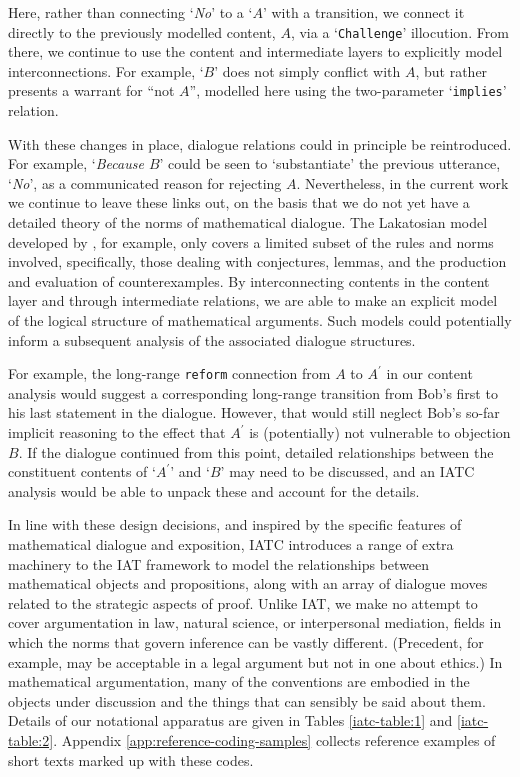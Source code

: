 \documentclass[smallextended,oneside]{svjour3}       %
\newcommand\nothing[1]{#1}
\let\paragraph\nothing
\begin{document}
Here, rather than connecting `\emph{No}' to a `$A$' with a transition, we connect
it directly to the previously modelled content, $A$, via a
`\texttt{Challenge}' illocution.  From there, we continue
to use the content and intermediate layers to explicitly model
interconnections.  For example,
`$B$' does not simply conflict with $A$, but rather presents a
warrant for ``not $A$'', modelled here using the two-parameter
`\texttt{implies}' relation.

With these changes in place, dialogue relations could in principle
be reintroduced.
For example, `\emph{Because $B$}' could be seen
to `substantiate' the previous utterance, `\emph{No}', as a communicated
reason for rejecting $A$.
Nevertheless, in the current work we continue to leave these links out, on the
basis that we do not yet have a detailed theory of the norms of mathematical dialogue.
The Lakatosian model developed by \citet{lak}, for example, only covers
a limited subset of the rules
and norms involved, specifically, those dealing with conjectures,
lemmas, and the production and evaluation of counterexamples.
By interconnecting contents in the content layer
and through intermediate relations,
we are able to make an explicit model of the logical structure of mathematical arguments.  Such models could potentially inform a subsequent analysis of the associated dialogue structures.

For example, the long-range \texttt{reform} connection from $A$ to $A^\prime$ in
our content analysis would suggest a corresponding long-range transition from
Bob's first to his last statement in the dialogue.
However, that would still neglect Bob's so-far implicit reasoning
to the effect that $A^\prime$ is (potentially) not vulnerable to objection $B$.
If the dialogue continued from this point, detailed relationships between the constituent contents of `$A^\prime$' and `$B$' may need to be discussed, and an IATC analysis would be able to unpack these and account for the details.

\paragraph{In line with these design decisions, and inspired by the specific features of mathematical dialogue and exposition, IATC introduces a range of extra machinery to the IAT framework to model the relationships between mathematical objects and propositions, along with an array of dialogue moves related to the strategic aspects of proof.}
Unlike IAT, we make no attempt to cover argumentation in law, natural
science, or interpersonal mediation, fields in which the norms that
govern inference can be vastly different.  (Precedent, for example,
may be acceptable in a legal argument but not in one about ethics.)
In mathematical argumentation, many of the conventions are embodied in the objects under
discussion and the things that can sensibly be said about them.
Details of our notational apparatus are given in Tables
\ref{iatc-table:1} and \ref{iatc-table:2}.  
Appendix \ref{app:reference-coding-samples}
collects reference examples of short texts marked up with these codes.
\end{document}
